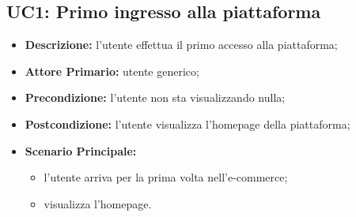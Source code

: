 \subsection{UC1: Primo ingresso alla piattaforma}
\label{sec:UC1}
\begin{itemize}
    \item \textbf{Descrizione:} l'utente effettua il primo accesso alla piattaforma;
    \item \textbf{Attore Primario:} utente generico;
    \item \textbf{Precondizione:} l'utente non sta visualizzando nulla;
    \item \textbf{Postcondizione:} l'utente visualizza l'homepage della piattaforma;
    \item \textbf{Scenario Principale:}
          \begin{itemize}
              \item l'utente arriva per la prima volta nell'e-commerce;
              \item visualizza l'homepage.
          \end{itemize}
\end{itemize}